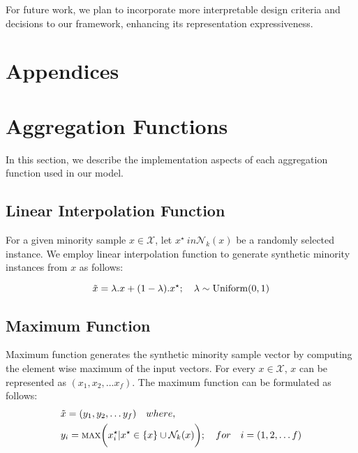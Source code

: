 For future work, we plan to incorporate more interpretable design criteria and decisions to our framework, enhancing its representation expressiveness.

\section*{Appendices}
\renewcommand{\thesection}{\Alph{section}}
\renewcommand{\thesubsection}{\Alph{section}.\arabic{subsection}}
\renewcommand{\theequation}
{\thesection.\arabic{equation}}

\setcounter{section}{0} %
\section{Aggregation Functions} \label{sec:agg}

In this section, we describe the implementation aspects of each aggregation function used in our model. 

\subsection{Linear Interpolation Function}

For a given minority sample $x \in \mathcal{X}$, let $x^{\star} \ in \mathcal{N}_k(x)$ be a randomly selected instance. We employ linear interpolation function to generate synthetic minority instances from $x$ as follows:

\begin{equation}
    \Tilde{x} = \lambda . x + (1- \lambda) . x^{\star} ; \quad \lambda \sim \text{Uniform}(0, 1) 
\end{equation}

\subsection{Maximum Function}

Maximum function generates the synthetic minority sample vector by computing the element wise maximum of the input vectors. For every $x \in \mathcal{X}$, $x$ can be represented as $(x_1, x_2, \dots x_f)$. The maximum function can be formulated as follows:
\begin{equation}
\begin{aligned}
    &\Tilde{x} = (y_1, y_2, \dots y_f) 
 \quad where,\\
    &y_i = \textsc{max}\bigg(x_i^{\star} | x^{\star} \in \{x\} \cup \mathcal{N}_k(x) \bigg) ; \quad for \quad i = (1, 2, \dots f)
\end{aligned}
\end{equation}

